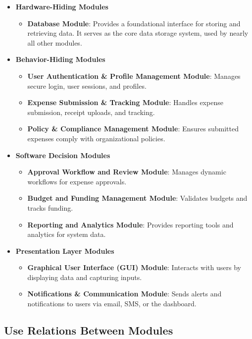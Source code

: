 \documentclass[12pt, titlepage]{article}
\begin{document}
\begin{itemize}
    \item \textbf{Hardware-Hiding Modules}
    \begin{itemize}
        \item \textbf{Database Module}: Provides a foundational interface for storing and retrieving data. It serves as the core data storage system, used by nearly all other modules.
    \end{itemize}
    
    \item \textbf{Behavior-Hiding Modules}
    \begin{itemize}
        \item \textbf{User Authentication \& Profile Management Module}: Manages secure login, user sessions, and profiles.
        \item \textbf{Expense Submission \& Tracking Module}: Handles expense submission, receipt uploads, and tracking.
        \item \textbf{Policy \& Compliance Management Module}: Ensures submitted expenses comply with organizational policies.
    \end{itemize}
    
    \item \textbf{Software Decision Modules}
    \begin{itemize}
        \item \textbf{Approval Workflow and Review Module}: Manages dynamic workflows for expense approvals.
        \item \textbf{Budget and Funding Management Module}: Validates budgets and tracks funding.
        \item \textbf{Reporting and Analytics Module}: Provides reporting tools and analytics for system data.
    \end{itemize}
    
    \item \textbf{Presentation Layer Modules}
    \begin{itemize}
        \item \textbf{Graphical User Interface (GUI) Module}: Interacts with users by displaying data and capturing inputs.
        \item \textbf{Notifications \& Communication Module}: Sends alerts and notifications to users via email, SMS, or the dashboard.
    \end{itemize}
\end{itemize}

\subsection{Use Relations Between Modules}
\end{document}
